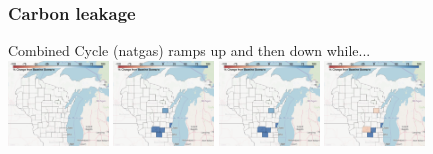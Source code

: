 \documentclass[xcolor=dvipsnames]{beamer}
\begin{document}
\begin{frame}
  \frametitle{Carbon leakage}


  \item Combined Cycle (natgas) ramps up and then down while... \\
  \includegraphics[width=0.2\textwidth]{includes/no_leakage_no_shutdowns_CC_r0.png}
  \includegraphics[width=0.2\textwidth]{includes/no_leakage_no_shutdowns_CC_r2.png}
  \includegraphics[width=0.2\textwidth]{includes/no_leakage_no_shutdowns_CC_r3.png}
  \includegraphics[width=0.2\textwidth]{includes/no_leakage_no_shutdowns_CC_r4.png}




\end{frame}
\end{document}
